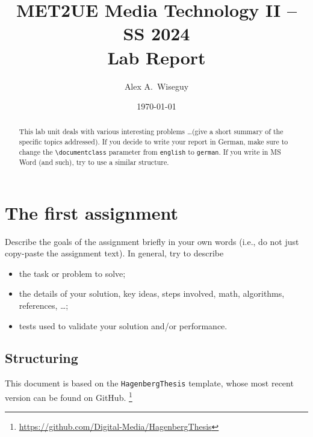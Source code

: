 \documentclass[english,notitlepage,smartquotes]{hgbreport}
\begin{document}

\author{Alex A.\ Wiseguy}                      %
\title{MET2UE Media Technology II -- SS 2024\\ %
				Lab Report }
\date{\today}

\maketitle

\begin{abstract}\noindent
This lab unit deals with various interesting problems \ldots (give a short
summary of the specific topics addressed). If you decide to write your report
in German, make sure to change the \verb!\documentclass! parameter from
\texttt{english} to \texttt{german}. If you write in MS Word (and such), try
to use a similar structure.
\end{abstract}


\section{The first assignment}

Describe the goals of the assignment briefly in your own words (i.e., do not
just copy-paste the assignment text). In general, try to describe
%
\begin{itemize}
	\item the task or problem to solve;
	\item the details of your solution, key ideas, steps involved, math,
	algorithms, references, \ldots;
	\item tests used to validate your solution and/or performance.
\end{itemize}

\subsection{Structuring} %

This \latex document is based on the \texttt{HagenbergThesis} template, whose
most recent version can be found on GitHub.%
\footnote{\url{https://github.com/Digital-Media/HagenbergThesis}}
\end{document}
